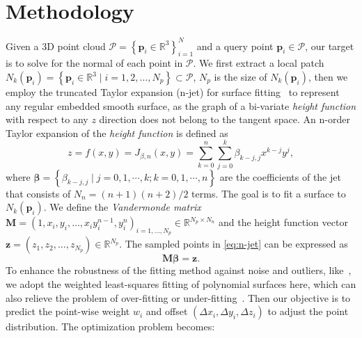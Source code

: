 \documentclass[runningheads]{llncs}
\begin{document}
\section{Methodology}\label{sec:meth}
 Given a 3D point cloud $\mathcal{P}=\left\{\mathbf{p}_{i}\in \mathbb{R}^3\right\}_{i=1}^{N}$ and a query point $\mathbf{p}_{i} \in \mathcal{P}$, our target is to solve for the normal of each point in $\mathcal{P}$. We first extract a local patch $N_k\left(\mathbf{p}_{i}\right)=\left\{\mathbf{p}_{i}\in \mathbb{R}^3 \mid i=1,2, \ldots, N_{p}\right\}  \subset \mathcal{P}$, $N_{p}$ is the size of $N_k\left(\mathbf{p}_{i}\right)$, then we employ the truncated Taylor expansion (n-jet) for surface fitting~\cite{cazals2005estimating} to represent any regular embedded smooth surface, as the graph of a bi-variate \textit{height function} with respect to any $z$ direction does not belong to the tangent space. An n-order Taylor expansion of the \textit{height function} is defined as 
\begin{equation}
z = f\left(x,y\right)
=J_{{\beta}, n}(x, y)
=\sum_{k=0}^{n} \sum_{j=0}^{k} {\beta}_{k-j, j} x^{k-j} y^{j},
\label{eq:n-jet}
\end{equation}
where $\boldsymbol{\beta} = \left\{{\beta}_{k-j, j} \mid j=0,1,\cdots,k; k=0,1,\cdots,n\right\}$ are the coefficients of the jet that consists of $N_{n}=(n+1)(n+2) / 2$ terms. 
The goal is to fit a surface to $N_k\left(\mathbf{p}_{i}\right)$. We define the \textit{Vandermonde matrix} $\mathbf{M} =\left(1, x_{i}, y_{i}, \ldots, x_{i} y_{i}^{n-1}, y_{i}^{n}\right)_{i=1, \ldots, N_{p}} \in \mathbb{R}^{N_{p} \times N_{n}}$ and the height function vector $\mathbf{z} =\left(z_{1}, z_{2},\ldots, z_{N_{p}}\right) \in \mathbb{R}^{N_{p}}$.
The sampled points in \cref{eq:n-jet} can be expressed as 
\begin{equation}
\mathbf{M} \boldsymbol{\beta}=\mathbf{z}.
\end{equation}
To enhance the robustness of the fitting method against noise and outliers, like~\cite{ben2020deepfit}, we adopt the weighted least-squares fitting of polynomial surfaces here, which can also relieve the problem of over-fitting or under-fitting~\cite{zhu2021adafit}. Then our objective is to predict the point-wise weight $w_{i}$ and offset $\left(\Delta x_{i},\Delta y_{i}, \Delta z_{i}\right)$ to adjust the point distribution. The optimization problem becomes:
\end{document}
